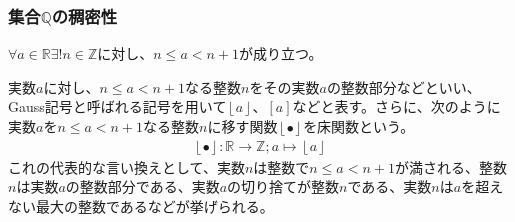 \documentclass[dvipdfmx]{jsarticle}
\begin{document}
\subsubsection{集合$\mathbb{Q}$の稠密性}%
\begin{thm}\label{4.1.4.19}
$\forall a \in \mathbb{R}\exists!n \in \mathbb{Z}$に対し、$n \leq a < n + 1$が成り立つ。
\end{thm}
\begin{dfn}
実数$a$に対し、$n \leq a < n + 1$なる整数$n$をその実数$a$の整数部分などといい、Gauss記号と呼ばれる記号を用いて$\left\lfloor a \right\rfloor$、$[ a]$などと表す。さらに、次のように実数$a$を$n \leq a < n + 1$なる整数$n$に移す関数$\left\lfloor \bullet \right\rfloor$を床関数という。
\begin{align*}
\left\lfloor \bullet \right\rfloor:\mathbb{R} \rightarrow \mathbb{Z};a \mapsto \left\lfloor a \right\rfloor
\end{align*}
これの代表的な言い換えとして、実数$n$は整数で$n \leq a < n + 1$が満される、整数$n$は実数$a$の整数部分である、実数$a$の切り捨てが整数$n$である、実数$n$は$a$を超えない最大の整数であるなどが挙げられる。
\end{dfn}
\end{document}
